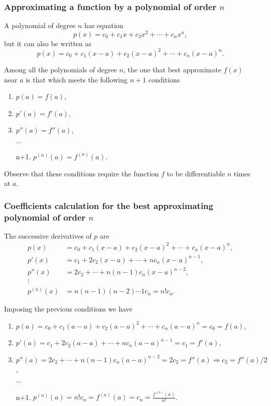 \begin{frame}
\frametitle{Approximating a function by a polynomial of order $n$}
A polynomial of degree $n$ has equation
\[
p(x) = c_0+c_1x+c_2x^2+\cdots +c_nx^n,
\]
but it can also be written as
\[
p(x) = c_0+c_1(x-a)+c_2(x-a)^2+\cdots +c_n(x-a)^n.
\]

Among all the polynomials of degree $n$, the one that best approximate $f(x)$ near $a$ is that which meets the following $n+1$ conditions
\begin{enumerate}
\item $p(a) = f(a)$,
\item $p'(a) = f'(a)$,
\item $p''(a)=f''(a)$,
\item[] $\cdots$
\item[n+1.] $p^{(n)}(a)=f^{(n)}(a)$.
\end{enumerate}

\alert{Observe that these conditions require the function $f$ to be differentiable $n$ times at $a$.}
\end{frame}


\begin{frame}
\frametitle{Coefficients calculation for the best approximating polynomial of order $n$}
The successive derivatives of $p$ are 
\begin{align*}
p(x) &= c_0+c_1(x-a)+c_2(x-a)^2+\cdots +c_n(x-a)^n,\\
p'(x)& = c_1+2c_2(x-a)+\cdots +nc_n(x-a)^{n-1},\\
p''(x)& = 2c_2+\cdots +n(n-1)c_n(x-a)^{n-2},\\
\vdots\ \
\\
p^{(n)}(x)&= n(n-1)(n-2)\cdots 1 c_n=n!c_n.
\end{align*}

Imposing the previous conditions we have
\begin{enumerate}
\item $p(a) = c_0+c_1(a-a)+c_2(a-a)^2+\cdots +c_n(a-a)^n=c_0=f(a)$,
\item $p'(a) = c_1+2c_2(a-a)+\cdots +nc_n(a-a)^{n-1}=c_1=f'(a)$,
\item $p''(a) = 2c_2+\cdots +n(n-1)c_n(a-a)^{n-2}=2c_2=f''(a)\Rightarrow c_2=f''(a)/2$,
\item[] $\cdots$
\item[n+1.] $p^{(n)}(a)=n!c_n=f^{(n)}(a)=c_n=\frac{f^{(n)}(a)}{n!}$.
\end{enumerate}
\end{frame}


